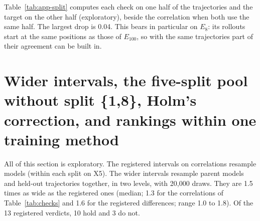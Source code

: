 Table~\ref{tab:app-split} computes each check on one half of the trajectories and the target on the other half
(exploratory), beside the correlation when both use the same half. The largest drop is 0.04.
This bears in particular on $E_8$: its rollouts start at the same positions as those of $E_{100}$, so with the same
trajectories part of their agreement can be built in.

\begin{table}[h]
\centering
\caption{Split-half check (exploratory): Spearman correlation with $E_{100}$ when the check and the target come from
different halves of the held-out trajectories, with its 95\% interval, and when both come from the same half.}
\label{tab:app-split}
\footnotesize
\setlength{\tabcolsep}{4pt}
\end{table}

\FloatBarrier
\section{Wider intervals, the five-split pool without split \{1,8\}, Holm's correction, and rankings within one training method}\label{app:A4}
All of this section is exploratory. The registered intervals on correlations resample models (within each split on
X5). The wider intervals resample parent models and held-out trajectories together, in two levels, with 20{,}000 draws. They are 1.5 times as wide as the
registered ones (median; 1.3 for the correlations of Table~\ref{tab:checks} and 1.6 for
the registered differences; range 1.0 to 1.8). Of the 13 registered verdicts,
10 hold and 3 do not.

